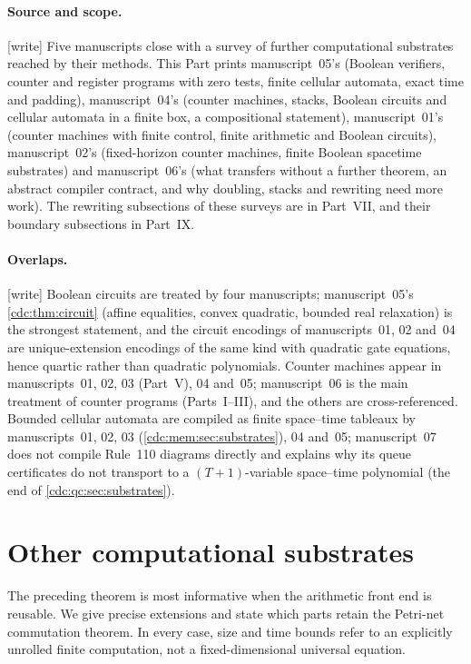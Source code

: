 \documentclass[11pt,a4paper]{article}
\theoremstyle{definition}
\theoremstyle{remark}
\newcommand{\wtag}{\textup{[write]}}%
\newcommand{\srctag}[1]{\texorpdfstring{\hspace{0.5em}{\normalfont\small\color{accent}[#1]}}{ [#1]}}
\begin{document}
\paragraph{Source and scope.} \wtag{} Five manuscripts close with a survey of further computational substrates reached by their methods. This Part prints manuscript~05's (Boolean verifiers, counter and register programs with zero tests, finite cellular automata, exact time and padding), manuscript~04's (counter machines, stacks, Boolean circuits and cellular automata in a finite box, a compositional statement), manuscript~01's (counter machines with finite control, finite arithmetic and Boolean circuits), manuscript~02's (fixed-horizon counter machines, finite Boolean spacetime substrates) and manuscript~06's (what transfers without a further theorem, an abstract compiler contract, and why doubling, stacks and rewriting need more work). The rewriting subsections of these surveys are in Part~VII, and their boundary subsections in Part~IX.

\paragraph{Overlaps.} \wtag{} Boolean circuits are treated by four manuscripts; manuscript~05's \cref{cdc:thm:circuit} (affine equalities, convex quadratic, bounded real relaxation) is the strongest statement, and the circuit encodings of manuscripts~01, 02 and~04 are unique-extension encodings of the same kind with quadratic gate equations, hence quartic rather than quadratic polynomials. Counter machines appear in manuscripts~01, 02, 03 (Part~V), 04 and~05; manuscript~06 is the main treatment of counter programs (Parts~I--III), and the others are cross-referenced. Bounded cellular automata are compiled as finite space--time tableaux by manuscripts~01, 02, 03 (\cref{cdc:mem:sec:substrates}), 04 and~05; manuscript~07 does not compile Rule~110 diagrams directly and explains why its queue certificates do not transport to a $(T+1)$-variable space--time polynomial (the end of \cref{cdc:qc:sec:substrates}).

\section{Other computational substrates\srctag{05}}
\label{cdc:sec:substrates}
The preceding theorem is most informative when the arithmetic front end is reusable. We give precise extensions and state which parts retain the Petri-net commutation theorem. In every case, size and time bounds refer to an explicitly unrolled finite computation, not a fixed-dimensional universal equation.
\end{document}
